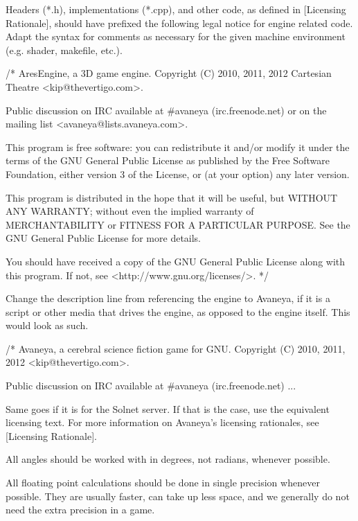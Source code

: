 Headers (*.h), implementations (*.cpp), and other code, as defined in [Licensing Rationale], should have prefixed the following legal notice for engine related code. Adapt the syntax for comments as necessary for the given machine environment (e.g. shader, makefile, etc.).

\startCodeExample
/*
    AresEngine, a 3D game engine.
    Copyright (C) 2010, 2011, 2012 Cartesian Theatre <kip@thevertigo.com>.

    Public discussion on IRC available at #avaneya (irc.freenode.net)
    or on the mailing list <avaneya@lists.avaneya.com>.

    This program is free software: you can redistribute it and/or modify
    it under the terms of the GNU General Public License as published by
    the Free Software Foundation, either version 3 of the License, or
    (at your option) any later version.

    This program is distributed in the hope that it will be useful,
    but WITHOUT ANY WARRANTY; without even the implied warranty of
    MERCHANTABILITY or FITNESS FOR A PARTICULAR PURPOSE.  See the
    GNU General Public License for more details.

    You should have received a copy of the GNU General Public License
    along with this program.  If not, see <http://www.gnu.org/licenses/>.
*/
\stopCodeExample

Change the description line from referencing the engine to Avaneya, if it is a script or other media that drives the engine, as opposed to the engine itself. This would look as such.

\startCodeExample
/*
    Avaneya, a cerebral science fiction game for GNU.
    Copyright (C) 2010, 2011, 2012 <kip@thevertigo.com>.

    Public discussion on IRC available at #avaneya (irc.freenode.net)
    ...
\stopCodeExample

Same goes if it is for the Solnet server. If that is the case, use the equivalent licensing text. For more information on Avaneya's licensing rationales, see [Licensing Rationale].


\startitemize[4]
\item
All angles should be worked with in degrees, not radians, whenever possible.

\item
All floating point calculations should be done in single precision whenever possible. They are usually faster, can take up less space, and we generally do not need the extra precision in a game.
\stopitemize

